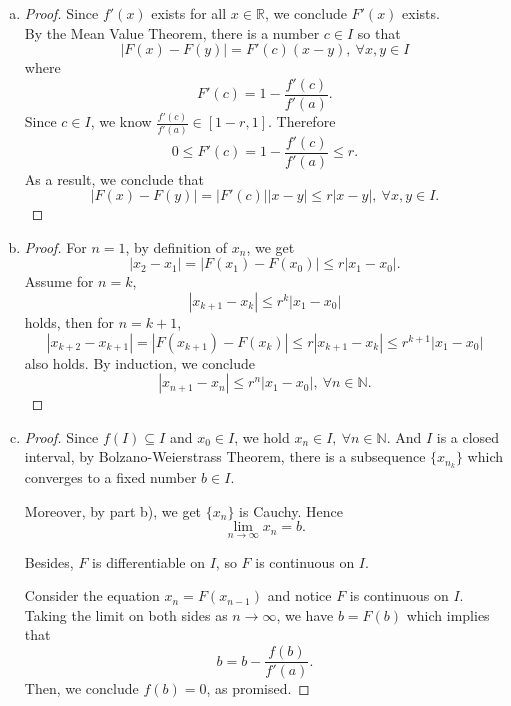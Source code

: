 \documentclass{report}
\begin{document}
\setcounter{Exercise}{6}
\vspace{12pt}
\begin{Exercise}
\begin{enumerate}[a)]
\item 
\begin{proof}
Since $f'(x)$ exists for all $x \in \mathbb{R}$, we conclude $F'(x)$ exists. \\
By the Mean Value Theorem, there is a number $c \in I$ so that $$ |F(x)-F(y)| = F'(c)(x-y),\ \forall x,y \in I$$
where $$F'(c) = 1-\frac{f'(c)}{f'(a)}.$$
Since $c \in I$, we know $\frac{f'(c)}{f'(a)} \in [1-r,1]$. Therefore $$ 0 \leq F'(c) = 1-\frac{f'(c)}{f'(a)} \leq r.$$
As a result, we conclude that $$|F(x)-F(y)| = |F'(c)||x-y| \leq r|x-y|,\ \forall x,y \in I. $$
\end{proof}

\item
\begin{proof}
For $n=1$, by definition of $x_n$, we get $$|x_2-x_1| = |F(x_1)-F(x_0)| \leq r|x_1-x_0|.$$
Assume for $n=k$, $$|x_{k+1}-x_{k}| \leq r^k|x_1-x_0|$$ holds, then for $n=k+1$, $$|x_{k+2}-x_{k+1}| = |F(x_{k+1})-F(x_{k})| \leq r|x_{k+1}-x_{k}| \leq r^{k+1}|x_1-x_0|$$ also holds.
By induction, we conclude $$|x_{n+1}-x_{n}| \leq r^n|x_1-x_0|,\ \forall n \in \mathbb{N}.$$
\end{proof}

\item 
\begin{proof}
Since $f(I) \subseteq I$ and $x_0 \in I$, we hold $x_n \in I,\ \forall n \in \mathbb{N}$. And $I$ is a closed interval, by Bolzano-Weierstrass Theorem, there is a subsequence $\{x_{n_k}\}$ which converges to a fixed number $b \in I$.

\vspace{1ex}

Moreover, by part b), we get $ \{x_n\}$  is Cauchy. Hence $$\lim_{n\to\infty} x_n = b. $$

Besides, $F$ is differentiable on $I$, so $F$ is continuous on $I$.

\vspace{1ex}

Consider the equation $x_n = F(x_{n-1})$ and notice $F$ is continuous on $I$. Taking the limit on both sides as $n\to\infty$, we have $b=F(b)$ which implies that $$b=b-\frac{f(b)}{f'(a)}.$$
Then, we conclude $f(b)=0$, as promised.
\end{proof}
\end{enumerate}
\end{Exercise}
\end{document}
